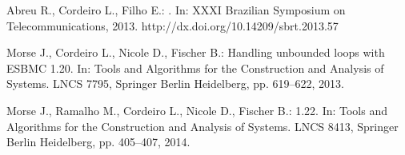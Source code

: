 \documentclass{acm_sen_article}
\begin{document}
\begin{thebibliography}{1}
Abreu R., Cordeiro L., Filho E.:
. 
\newblock In: XXXI Brazilian Symposium on Telecommunications, 2013.
\newblock http://dx.doi.org/10.14209/sbrt.2013.57

Morse J., Cordeiro L., Nicole D., Fischer B.:
\newblock Handling unbounded loops with {ESBMC} 1.20.
\newblock In: Tools and Algorithms for the Construction and Analysis of
  Systems. LNCS 7795, Springer Berlin Heidelberg, pp. 619--622, 2013.

Morse J., Ramalho M., Cordeiro L., Nicole D., Fischer B.:
 1.22.
\newblock In: Tools and Algorithms for the Construction and Analysis of
  Systems. LNCS 8413, Springer Berlin Heidelberg, pp. 405--407, 2014.

\end{thebibliography}




\end{document}
